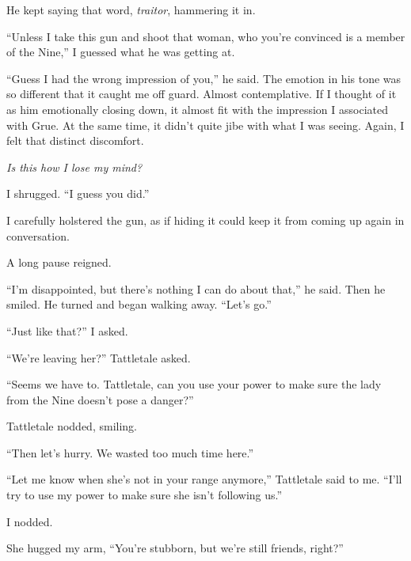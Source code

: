 He kept saying that word, \emph{traitor}, hammering it in.



``Unless I take this gun and shoot that woman, who you're convinced is a member of the Nine,'' I guessed what he was getting at.



``Guess I had the wrong impression of you,'' he said.  The emotion in his tone was so different that it caught me off guard.  Almost contemplative.  If I thought of it as him emotionally closing down, it almost fit with the impression I associated with Grue.  At the same time, it didn't quite jibe with what I was seeing.  Again, I felt that distinct discomfort.



\emph{Is this how I lose my mind?}



I shrugged.  ``I guess you did.''



I carefully holstered the gun, as if hiding it could keep it from coming up again in conversation.



A long pause reigned.



``I'm disappointed, but there's nothing I can do about that,'' he said.  Then he smiled.  He turned and began walking away.  ``Let's go.''



``Just like that?''  I asked.



``We're leaving her?''  Tattletale asked.



``Seems we have to.  Tattletale, can you use your power to make sure the lady from the Nine doesn't pose a danger?''



Tattletale nodded, smiling.



``Then let's hurry.  We wasted too much time here.''



``Let me know when she's not in your range anymore,'' Tattletale said to me.  ``I'll try to use my power to make sure she isn't following us.''



I nodded.



She hugged my arm, ``You're stubborn, but we're still friends, right?''



